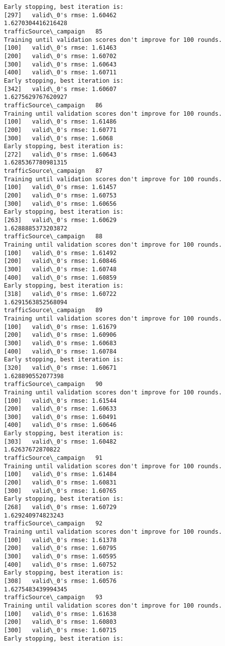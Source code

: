 \documentclass[11pt]{article}
\begin{document}
\begin{Verbatim}[commandchars=\\\{\}]
Early stopping, best iteration is:
[297]	valid\_0's rmse: 1.60462
1.6270304416216428
trafficSource\_campaign   85
Training until validation scores don't improve for 100 rounds.
[100]	valid\_0's rmse: 1.61463
[200]	valid\_0's rmse: 1.60702
[300]	valid\_0's rmse: 1.60643
[400]	valid\_0's rmse: 1.60711
Early stopping, best iteration is:
[342]	valid\_0's rmse: 1.60607
1.6275629767620927
trafficSource\_campaign   86
Training until validation scores don't improve for 100 rounds.
[100]	valid\_0's rmse: 1.61486
[200]	valid\_0's rmse: 1.60771
[300]	valid\_0's rmse: 1.6068
Early stopping, best iteration is:
[272]	valid\_0's rmse: 1.60643
1.6285367780981315
trafficSource\_campaign   87
Training until validation scores don't improve for 100 rounds.
[100]	valid\_0's rmse: 1.61457
[200]	valid\_0's rmse: 1.60753
[300]	valid\_0's rmse: 1.60656
Early stopping, best iteration is:
[263]	valid\_0's rmse: 1.60629
1.6288885373203872
trafficSource\_campaign   88
Training until validation scores don't improve for 100 rounds.
[100]	valid\_0's rmse: 1.61492
[200]	valid\_0's rmse: 1.60846
[300]	valid\_0's rmse: 1.60748
[400]	valid\_0's rmse: 1.60859
Early stopping, best iteration is:
[318]	valid\_0's rmse: 1.60722
1.6291563852568094
trafficSource\_campaign   89
Training until validation scores don't improve for 100 rounds.
[100]	valid\_0's rmse: 1.61679
[200]	valid\_0's rmse: 1.60906
[300]	valid\_0's rmse: 1.60683
[400]	valid\_0's rmse: 1.60784
Early stopping, best iteration is:
[320]	valid\_0's rmse: 1.60671
1.628890552077398
trafficSource\_campaign   90
Training until validation scores don't improve for 100 rounds.
[100]	valid\_0's rmse: 1.61544
[200]	valid\_0's rmse: 1.60633
[300]	valid\_0's rmse: 1.60491
[400]	valid\_0's rmse: 1.60646
Early stopping, best iteration is:
[303]	valid\_0's rmse: 1.60482
1.62637672870822
trafficSource\_campaign   91
Training until validation scores don't improve for 100 rounds.
[100]	valid\_0's rmse: 1.61484
[200]	valid\_0's rmse: 1.60831
[300]	valid\_0's rmse: 1.60765
Early stopping, best iteration is:
[268]	valid\_0's rmse: 1.60729
1.629240974823243
trafficSource\_campaign   92
Training until validation scores don't improve for 100 rounds.
[100]	valid\_0's rmse: 1.61378
[200]	valid\_0's rmse: 1.60795
[300]	valid\_0's rmse: 1.60595
[400]	valid\_0's rmse: 1.60752
Early stopping, best iteration is:
[308]	valid\_0's rmse: 1.60576
1.6275483439994345
trafficSource\_campaign   93
Training until validation scores don't improve for 100 rounds.
[100]	valid\_0's rmse: 1.61638
[200]	valid\_0's rmse: 1.60803
[300]	valid\_0's rmse: 1.60715
Early stopping, best iteration is:

\end{Verbatim}
\end{document}
